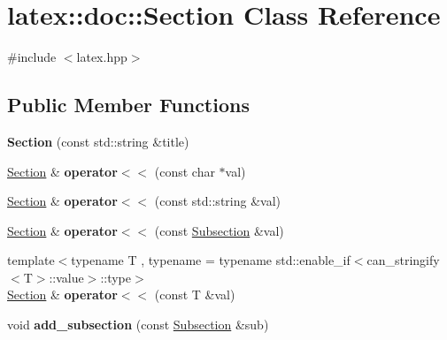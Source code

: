 \hypertarget{classlatex_1_1doc_1_1Section}{\section{latex\-:\-:doc\-:\-:Section Class Reference}
\label{classlatex_1_1doc_1_1Section}
}


{\ttfamily \#include $<$latex.\-hpp$>$}

\subsection*{Public Member Functions}
\begin{DoxyCompactItemize}
\item 
\hypertarget{classlatex_1_1doc_1_1Section_a675efb7af929560c3a6a07536c50d133}{{\bfseries Section} (const std\-::string \&title)}\label{classlatex_1_1doc_1_1Section_a675efb7af929560c3a6a07536c50d133}

\item 
\hypertarget{classlatex_1_1doc_1_1Section_a53e777158eda75ac8f5cac6362d9f174}{\hyperlink{classlatex_1_1doc_1_1Section}{Section} \& {\bfseries operator$<$$<$} (const char $\ast$val)}\label{classlatex_1_1doc_1_1Section_a53e777158eda75ac8f5cac6362d9f174}

\item 
\hypertarget{classlatex_1_1doc_1_1Section_a92952468be4cbb0d120130e3758d4477}{\hyperlink{classlatex_1_1doc_1_1Section}{Section} \& {\bfseries operator$<$$<$} (const std\-::string \&val)}\label{classlatex_1_1doc_1_1Section_a92952468be4cbb0d120130e3758d4477}

\item 
\hypertarget{classlatex_1_1doc_1_1Section_aae377afedd501650c33197a086f7e4b0}{\hyperlink{classlatex_1_1doc_1_1Section}{Section} \& {\bfseries operator$<$$<$} (const \hyperlink{classlatex_1_1doc_1_1Subsection}{Subsection} \&val)}\label{classlatex_1_1doc_1_1Section_aae377afedd501650c33197a086f7e4b0}

\item 
\hypertarget{classlatex_1_1doc_1_1Section_ad48591936cf908cf47b311648cd9c436}{{\footnotesize template$<$typename T , typename  = typename std\-::enable\-\_\-if$<$can\-\_\-stringify$<$\-T$>$\-::value$>$\-::type$>$ }\\\hyperlink{classlatex_1_1doc_1_1Section}{Section} \& {\bfseries operator$<$$<$} (const T \&val)}\label{classlatex_1_1doc_1_1Section_ad48591936cf908cf47b311648cd9c436}

\item 
\hypertarget{classlatex_1_1doc_1_1Section_ab6ac21c9c03fec82ad67758d2eef050a}{void {\bfseries add\-\_\-subsection} (const \hyperlink{classlatex_1_1doc_1_1Subsection}{Subsection} \&sub)}\label{classlatex_1_1doc_1_1Section_ab6ac21c9c03fec82ad67758d2eef050a}

\end{DoxyCompactItemize}
